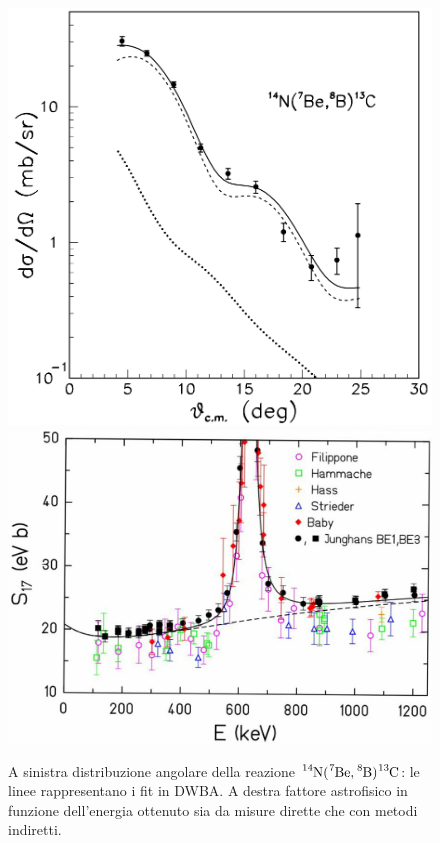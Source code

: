 \begin{figure}[h]
	\centering
	\includegraphics[scale=0.4]{Immagini/0421_theta2.png}
	\includegraphics[scale=0.4]{Immagini/0421_E-keV.png}
	\caption{A sinistra distribuzione angolare della reazione $\ce{^{14}N}(\ce{^7Be},\ce{^8B})\ce{^{13}C}$: le linee rappresentano i fit in DWBA. A destra fattore astrofisico in funzione dell'energia ottenuto sia da misure dirette che con metodi indiretti.}
	\label{0421_BepgB}
\end{figure}



